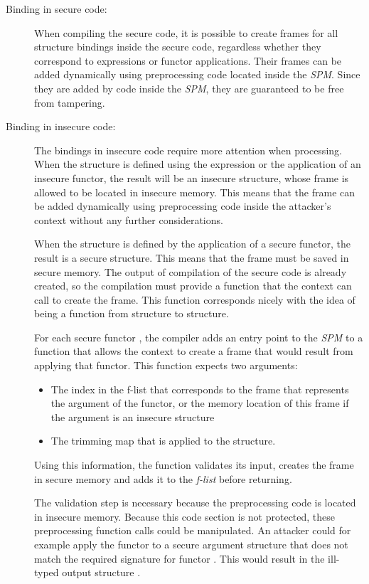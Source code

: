\begin{description}
\item[Binding in secure code:] When compiling the secure code, it is possible to create frames for all structure bindings inside the secure code, regardless whether they correspond to  expressions or functor applications.
Their frames can be added dynamically using preprocessing code located inside the \emph{SPM}. 
Since they are added by code inside the \emph{SPM}, they are guaranteed to be free from tampering.
\item[Binding in insecure code:] The bindings in insecure code require more attention when processing.
When the structure is defined using the  expression or the application of an insecure functor, the result will be an insecure structure, whose frame is allowed to be located in insecure memory.
This means that the frame can be added dynamically using preprocessing code inside the attacker's context without any further considerations.

When the structure is defined by the application of a secure functor, the result is a secure structure.
This means that the frame must be saved in secure memory.
The output of compilation of the secure code is already created, so the compilation must provide a function that the context can call to create the frame.
This function corresponds nicely with the idea of  being a function from structure to structure.

For each secure functor , the compiler adds an entry point to the \emph{SPM} to a function that allows the context to create a frame that would result from applying that functor.
This function expects two arguments: 
\begin{itemize}
\item The index in the f-list that corresponds to the frame that represents the argument of the functor, or the memory location of this frame if the argument is an insecure structure
\item The trimming map that is applied to the structure.
\end{itemize}
Using this information, the function validates its input, creates the frame in secure memory and adds it to the \emph{f-list} before returning.

The validation step is necessary because the preprocessing code is located in insecure memory.
Because this code section is not protected, these preprocessing function calls could be manipulated. 
An attacker could for example apply the functor  to a secure argument structure  that does not match the required signature for functor . 
This would result in the ill-typed output structure .


\end{description}
